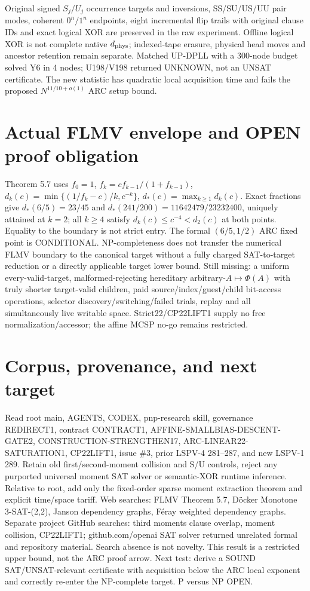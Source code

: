 \documentclass[11pt]{article}
\begin{document}
Original signed $S_j/U_j$ occurrence targets and inversions, SS/SU/US/UU pair modes, coherent $0^n/1^n$ endpoints, eight incremental flip trails with original clause IDs and exact logical XOR are preserved in the raw experiment. Offline logical XOR is not complete native $d_{\rm phys}$; indexed-tape erasure, physical head moves and ancestor retention remain separate. Matched UP-DPLL with a 300-node budget solved Y6 in 4 nodes; U198/V198 returned UNKNOWN, not an UNSAT certificate. The new statistic has quadratic local acquisition time and fails the proposed $N^{11/10+o(1)}$ ARC setup bound.

\section*{Actual FLMV envelope and OPEN proof obligation}
Theorem 5.7 uses $f_0=1$, $f_k=cf_{k-1}/(1+f_{k-1})$, $d_k(c)=\min\{(1/f_k-c)/k,c^{-k}\}$, $d_*(c)=\max_{k\ge1}d_k(c)$. Exact fractions give $d_*(6/5)=23/45$ and $d_*(241/200)=11642479/23232400$, uniquely attained at $k=2$; all $k\ge4$ satisfy $d_k(c)\le c^{-4}<d_2(c)$ at both points. Equality to the boundary is not strict entry. The formal $(6/5,1/2)$ ARC fixed point is CONDITIONAL. NP-completeness does not transfer the numerical FLMV boundary to the canonical target without a fully charged SAT-to-target reduction or a directly applicable target lower bound. Still missing: a uniform every-valid-target, malformed-rejecting hereditary arbitrary-$A\mapsto\Phi(A)$ with truly shorter target-valid children, paid source/index/guest/child bit-access operations, selector discovery/switching/failed trials, replay and all simultaneously live writable space. Strict22/CP22LIFT1 supply no free normalization/accessor; the affine MCSP no-go remains restricted.

\section*{Corpus, provenance, and next target}
Read root main, AGENTS, CODEX, pnp-research skill, governance REDIRECT1, contract CONTRACT1, AFFINE-SMALLBIAS-DESCENT-GATE2, CONSTRUCTION-STRENGTHEN17, ARC-LINEAR22-SATURATION1, CP22LIFT1, issue \#3, prior LSPV-4 281--287, and new LSPV-1 289. Retain old first/second-moment collision and S/U controls, reject any purported universal moment SAT solver or semantic-XOR runtime inference. Relative to root, add only the fixed-order sparse moment extraction theorem and explicit time/space tariff. Web searches: FLMV Theorem 5.7, D\"ocker Monotone 3-SAT-(2,2), Janson dependency graphs, F\'eray weighted dependency graphs. Separate project GitHub searches: third moments clause overlap, moment collision, CP22LIFT1; github.com/openai SAT solver returned unrelated formal and repository material. Search absence is not novelty. This result is a restricted upper bound, not the ARC proof arrow. Next test: derive a SOUND SAT/UNSAT-relevant certificate with acquisition below the ARC local exponent and correctly re-enter the NP-complete target. P versus NP OPEN.
\end{document}

